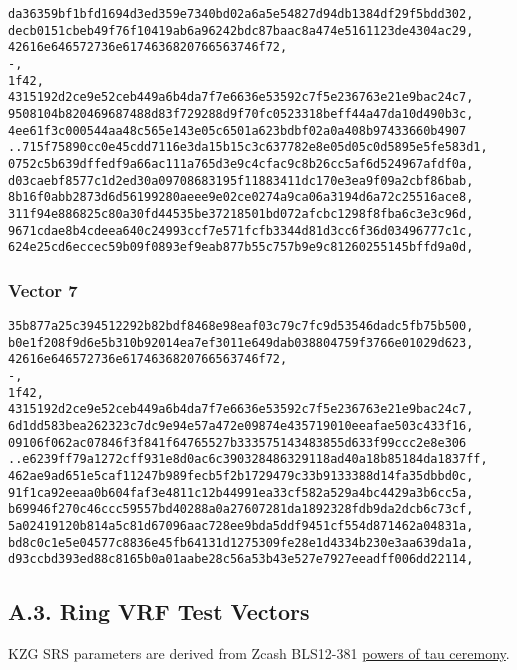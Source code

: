 \documentclass[
]{article}
\begin{document}
\begin{verbatim}
da36359bf1bfd1694d3ed359e7340bd02a6a5e54827d94db1384df29f5bdd302,
decb0151cbeb49f76f10419ab6a96242bdc87baac8a474e5161123de4304ac29,
42616e646572736e6174636820766563746f72,
-,
1f42,
4315192d2ce9e52ceb449a6b4da7f7e6636e53592c7f5e236763e21e9bac24c7,
9508104b820469687488d83f729288d9f70fc0523318beff44a47da10d490b3c,
4ee61f3c000544aa48c565e143e05c6501a623bdbf02a0a408b97433660b4907
..715f75890cc0e45cdd7116e3da15b15c3c637782e8e05d05c0d5895e5fe583d1,
0752c5b639dffedf9a66ac111a765d3e9c4cfac9c8b26cc5af6d524967afdf0a,
d03caebf8577c1d2ed30a09708683195f11883411dc170e3ea9f09a2cbf86bab,
8b16f0abb2873d6d56199280aeee9e02ce0274a9ca06a3194d6a72c25516ace8,
311f94e886825c80a30fd44535be37218501bd072afcbc1298f8fba6c3e3c96d,
9671cdae8b4cdeea640c24993ccf7e571fcfb3344d81d3cc6f36d03496777c1c,
624e25cd6eccec59b09f0893ef9eab877b55c757b9e9c81260255145bffd9a0d,
\end{verbatim}

\subsubsection{Vector 7}\label{vector-7-1}

\begin{verbatim}
35b877a25c394512292b82bdf8468e98eaf03c79c7fc9d53546dadc5fb75b500,
b0e1f208f9d6e5b310b92014ea7ef3011e649dab038804759f3766e01029d623,
42616e646572736e6174636820766563746f72,
-,
1f42,
4315192d2ce9e52ceb449a6b4da7f7e6636e53592c7f5e236763e21e9bac24c7,
6d1dd583bea262323c7dc9e94e57a472e09874e435719010eeafae503c433f16,
09106f062ac07846f3f841f64765527b333575143483855d633f99ccc2e8e306
..e6239ff79a1272cff931e8d0ac6c390328486329118ad40a18b85184da1837ff,
462ae9ad651e5caf11247b989fecb5f2b1729479c33b9133388d14fa35dbbd0c,
91f1ca92eeaa0b604faf3e4811c12b44991ea33cf582a529a4bc4429a3b6cc5a,
b69946f270c46ccc59557bd40288a0a27607281da1892328fdb9da2dcb6c73cf,
5a02419120b814a5c81d67096aac728ee9bda5ddf9451cf554d871462a04831a,
bd8c0c1e5e04577c8836e45fb64131d1275309fe28e1d4334b230e3aa639da1a,
d93ccbd393ed88c8165b0a01aabe28c56a53b43e527e7927eeadff006dd22114,
\end{verbatim}

\subsection{A.3. Ring VRF Test
Vectors}\label{a.3.-ring-vrf-test-vectors}

KZG SRS parameters are derived from Zcash BLS12-381
\href{https://zfnd.org/conclusion-of-the-powers-of-tau-ceremony}{powers
of tau ceremony}.
\end{document}
